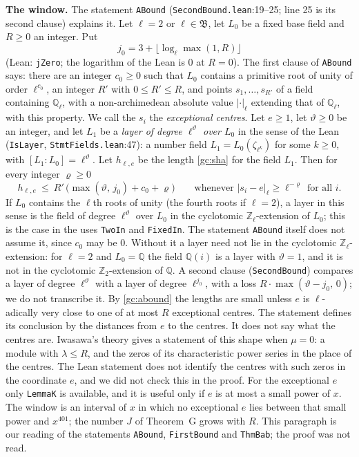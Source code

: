\documentclass[11pt,letterpaper]{article}
\newcommand{\Z}{\mathbb Z}\newcommand{\Q}{\mathbb Q}\newcommand{\C}{\mathbb C}
\begin{document}
\textbf{The window.} The statement \texttt{ABound} (\texttt{SecondBound.lean}:19--25; line 25 is its second
clause) explains it. Let
$\ell=2$ or $\ell\in\mathfrak B$, let $L_0$ be a fixed base field and $R\ge0$ an integer. Put
\begin{equation}\label{D:340}
 j_0=3+\lfloor\log_\ell\max(1,R)\rfloor
\end{equation}
(Lean: \texttt{jZero}; the logarithm of the Lean is $0$ at $R=0$). The first clause
of \texttt{ABound} says: there are an integer $c_0\ge0$ such that $L_0$ contains a primitive root of unity
of order $\ell^{c_0}$, an integer $R'$ with $0\le R'\le R$, and points $s_1,\dots,s_{R'}$ of a field containing
$\Q_\ell$, with a non-archimedean absolute value $|\cdot|_\ell$ extending that of $\Q_\ell$, with this
property. We call the $s_i$ the \emph{exceptional centres}. Let $e\ge1$, let $\vartheta\ge0$ be an integer,
and let $L_1$ be a \emph{layer of degree $\ell^{\vartheta}$ over $L_0$} in the sense of the Lean
(\texttt{IsLayer}, \texttt{StmtFields.lean}:47): a number field $L_1=L_0(\zeta_{\ell^{k}})$ for some $k\ge0$,
with $[L_1:L_0]=\ell^{\vartheta}$. Let $h_{\ell,e}$ be the length \eqref{gc:sha} for the field $L_1$. Then
for every integer $\varrho\ge0$
\begin{equation}\label{gc:abound}
 h_{\ell,e}\ \le\ R'\,\big(\max(\vartheta,\,j_0)+c_0+\varrho\big)
 \qquad\text{whenever } |s_i-e|_\ell\ge\ell^{-\varrho}\ \text{for all } i .
\end{equation}
If $L_0$ contains the $\ell$th roots of unity (the fourth roots if $\ell=2$), a layer in this sense is
the field of degree $\ell^{\vartheta}$ over $L_0$ in the cyclotomic $\Z_\ell$-extension of $L_0$; this is
the case in the uses \texttt{TwoIn} and \texttt{FixedIn}. The statement \texttt{ABound} itself does not
assume it, since $c_0$ may be $0$. Without it a layer need not lie in the cyclotomic $\Z_\ell$-extension:
for $\ell=2$ and $L_0=\Q$ the field $\Q(i)$ is a layer with $\vartheta=1$, and it is not in the cyclotomic
$\Z_2$-extension of $\Q$.
A second clause (\texttt{SecondBound}) compares a layer of degree $\ell^{\vartheta}$ with a layer of
degree $\ell^{j_0}$, with a loss $R\cdot\max(\vartheta-j_0,\,0)$; we do
not transcribe it. By \eqref{gc:abound} the lengths are small unless $e$ is $\ell$-adically very close to
one of at most $R$ exceptional centres. The statement defines its conclusion by the distances from $e$ to
the centres. It does not say what the centres are. Iwasawa's theory gives a statement of this shape when
$\mu=0$: a module with $\lambda\le R$, and the zeros of its characteristic power series in the place of the
centres. The Lean statement does not identify the centres with such zeros in the coordinate $e$, and we did
not check this in the proof. For the exceptional $e$ only \texttt{LemmaK} is available, and it is useful
only if $e$ is at most a small power of $x$. The window is an interval of $x$ in which no exceptional $e$
lies between that small power and $x^{401}$; the number $J$ of Theorem~G grows with $R$. This paragraph is
our reading of the statements \texttt{ABound}, \texttt{FirstBound} and \texttt{ThmBab}; the proof was not read.
\end{document}
